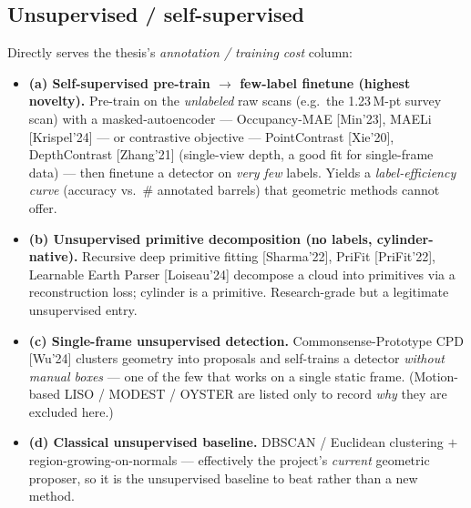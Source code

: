 \documentclass[10pt,a4paper]{article}
\begin{document}
\subsection{Unsupervised / self-supervised}
Directly serves the thesis's \emph{annotation / training cost} column:
\begin{itemize}[leftmargin=1.4em,itemsep=3pt,topsep=2pt]
  \item \textbf{(a) Self-supervised pre-train $\to$ few-label finetune (highest novelty).}
  Pre-train on the \emph{unlabeled} raw scans (e.g.\ the 1.23\,M-pt survey scan) with a
  masked-autoencoder --- Occupancy-MAE [Min'23], MAELi [Krispel'24] --- or contrastive
  objective --- PointContrast [Xie'20], DepthContrast [Zhang'21] (single-view depth, a good
  fit for single-frame data) --- then finetune a detector on \emph{very few} labels. Yields a
  \emph{label-efficiency curve} (accuracy vs.\ \# annotated barrels) that geometric methods
  cannot offer.
  \item \textbf{(b) Unsupervised primitive decomposition (no labels, cylinder-native).}
  Recursive deep primitive fitting [Sharma'22], PriFit [PriFit'22], Learnable Earth Parser
  [Loiseau'24] decompose a cloud into primitives via a reconstruction loss; cylinder is a
  primitive. Research-grade but a legitimate unsupervised entry.
  \item \textbf{(c) Single-frame unsupervised detection.} Commonsense-Prototype CPD [Wu'24]
  clusters geometry into proposals and self-trains a detector \emph{without manual boxes} ---
  one of the few that works on a single static frame. (Motion-based LISO / MODEST / OYSTER
  are listed only to record \emph{why} they are excluded here.)
  \item \textbf{(d) Classical unsupervised baseline.} DBSCAN / Euclidean clustering $+$
  region-growing-on-normals --- effectively the project's \emph{current} geometric proposer,
  so it is the unsupervised baseline to beat rather than a new method.
\end{itemize}
\end{document}
